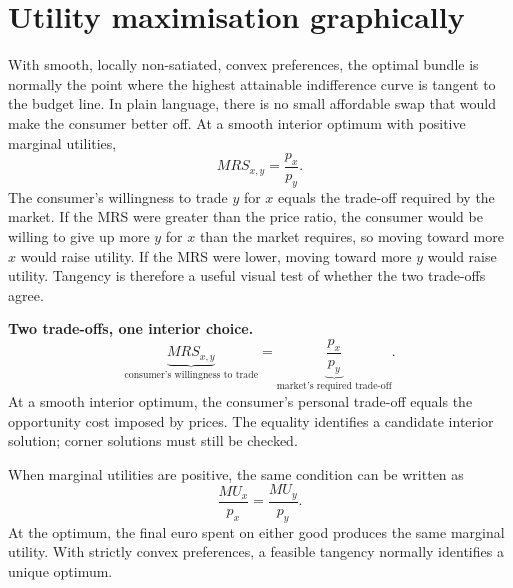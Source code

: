 \section{Utility maximisation graphically}

With smooth, locally non-satiated, convex preferences, the optimal bundle is
normally the point where the highest attainable indifference curve is tangent
to the budget line. In plain language, there is no small affordable swap that
would make the consumer better off. At a smooth interior optimum with
positive marginal utilities,
\[
MRS_{x,y}=\frac{p_x}{p_y}.
\]
The consumer's willingness to trade $y$ for $x$ equals the trade-off required
by the market. If the MRS were greater than the price ratio, the consumer
would be willing to give up more $y$ for $x$ than the market requires, so
moving toward more $x$ would raise utility. If the MRS were lower, moving
toward more $y$ would raise utility. Tangency is therefore a useful visual
test of whether the two trade-offs agree.

\begin{keyidea}
\textbf{Two trade-offs, one interior choice.}
\[
\underbrace{MRS_{x,y}}_{\text{consumer's willingness to trade}}
=
\underbrace{\frac{p_x}{p_y}}_{\text{market's required trade-off}}.
\]
At a smooth interior optimum, the consumer's personal trade-off equals the
opportunity cost imposed by prices. The equality identifies a candidate
interior solution; corner solutions must still be checked.
\end{keyidea}

When marginal utilities are positive, the same condition can be written as
\[
\frac{MU_x}{p_x}=\frac{MU_y}{p_y}.
\]
At the optimum, the final euro spent on either good produces the same marginal
utility. With strictly convex preferences, a feasible tangency normally
identifies a unique optimum.

